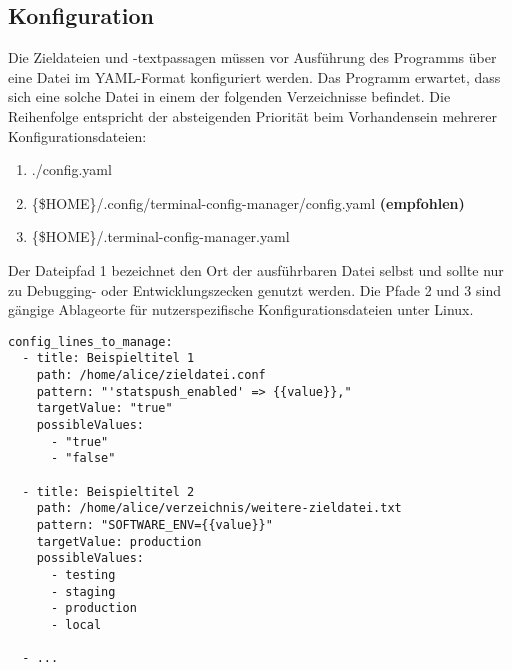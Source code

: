 \subsection{Konfiguration}
Die Zieldateien und -textpassagen müssen vor Ausführung des Programms
über eine Datei im YAML-Format konfiguriert werden.
Das Programm erwartet, dass sich eine solche Datei in einem der folgenden
Verzeichnisse befindet. Die Reihenfolge entspricht der absteigenden Priorität
beim Vorhandensein mehrerer Konfigurationsdateien:

\begin{enumerate}
    \item ./config.yaml
    \item \{\$HOME\}/.config/terminal-config-manager/config.yaml \textbf{(empfohlen)}
    \item \{\$HOME\}/.terminal-config-manager.yaml
\end{enumerate}

Der Dateipfad 1 bezeichnet den Ort der ausführbaren Datei selbst und sollte nur
zu Debugging- oder Entwicklungszecken genutzt werden. Die Pfade 2 und 3 sind
gängige Ablageorte für nutzerspezifische Konfigurationsdateien unter Linux.

\begin{verbatim}
config_lines_to_manage:
  - title: Beispieltitel 1
    path: /home/alice/zieldatei.conf
    pattern: "'statspush_enabled' => {{value}},"
    targetValue: "true"
    possibleValues:
      - "true"
      - "false"

  - title: Beispieltitel 2
    path: /home/alice/verzeichnis/weitere-zieldatei.txt
    pattern: "SOFTWARE_ENV={{value}}"
    targetValue: production
    possibleValues:
      - testing
      - staging
      - production
      - local

  - ...
\end{verbatim}